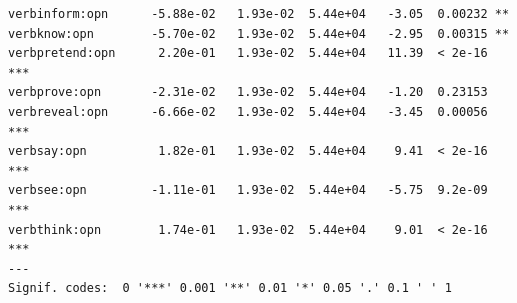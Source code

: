 \documentclass[10pt]{article}\usepackage[]{graphicx}\usepackage[]{color}
\makeatletter
\newenvironment{kframe}{%
 \def\at@end@of@kframe{}%
 \ifinner\ifhmode%
  \def\at@end@of@kframe{\end{minipage}}%
  \begin{minipage}{\columnwidth}%
 \fi\fi%
 \def\FrameCommand##1{\hskip\@totalleftmargin \hskip-\fboxsep
 \colorbox{shadecolor}{##1}\hskip-\fboxsep
     \hskip-\linewidth \hskip-\@totalleftmargin \hskip\columnwidth}%
 \MakeFramed {\advance\hsize-\width
   \@totalleftmargin\z@ \linewidth\hsize
   \@setminipage}}%
 {\par\unskip\endMakeFramed%
 \at@end@of@kframe}
\newenvironment{knitrout}{}{} %
\makeatother
\begin{document}
\begin{knitrout}
\begin{kframe}
\begin{verbatim}
verbinform:opn      -5.88e-02   1.93e-02  5.44e+04   -3.05  0.00232 ** 
verbknow:opn        -5.70e-02   1.93e-02  5.44e+04   -2.95  0.00315 ** 
verbpretend:opn      2.20e-01   1.93e-02  5.44e+04   11.39  < 2e-16 ***
verbprove:opn       -2.31e-02   1.93e-02  5.44e+04   -1.20  0.23153    
verbreveal:opn      -6.66e-02   1.93e-02  5.44e+04   -3.45  0.00056 ***
verbsay:opn          1.82e-01   1.93e-02  5.44e+04    9.41  < 2e-16 ***
verbsee:opn         -1.11e-01   1.93e-02  5.44e+04   -5.75  9.2e-09 ***
verbthink:opn        1.74e-01   1.93e-02  5.44e+04    9.01  < 2e-16 ***
---
Signif. codes:  0 '***' 0.001 '**' 0.01 '*' 0.05 '.' 0.1 ' ' 1
\end{verbatim}
\end{kframe}
\end{knitrout}
% 
% 
% 
% 
\end{document}
